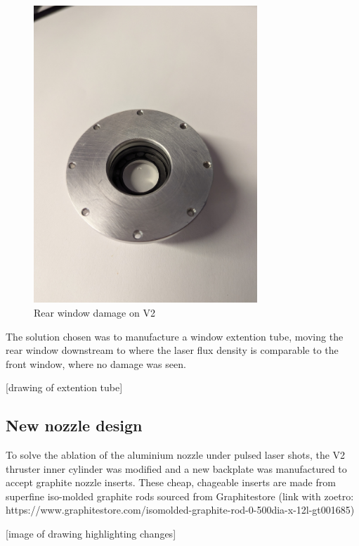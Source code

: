            \begin{figure}
                \centering
                \includegraphics[width=0.75\textwidth]{assets/5 results/window damage.jpg}
                \caption{Rear window damage on V2}
            \end{figure}

            The solution chosen was to manufacture a window extention tube, moving the rear window downstream to where the laser flux density is comparable to the front window, where no damage was seen.

            [drawing of extention tube]

        \subsection{New nozzle design}
            
            To solve the ablation of the aluminium nozzle under pulsed laser shots, the V2 thruster inner cylinder was modified and a new backplate was manufactured to accept graphite nozzle inserts. These cheap, chageable inserts are made from superfine iso-molded graphite rods sourced from Graphitestore (link with zoetro: https://www.graphitestore.com/isomolded-graphite-rod-0-500dia-x-12l-gt001685)

            [image of drawing highlighting changes]

